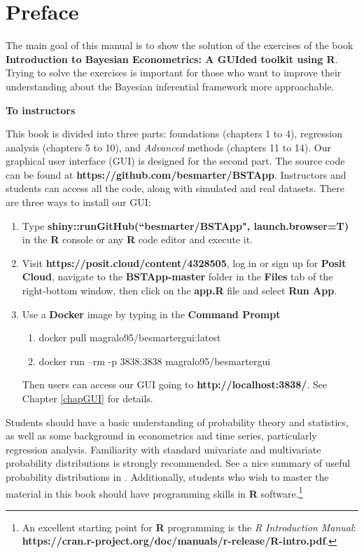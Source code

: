\chapter*{Preface}
The main goal of this manual is to show the solution of the exercises of the book \textbf{Introduction to Bayesian Econometrics: A GUIded toolkit using R}. Trying to solve the exercises is important for those who want to improve their understanding about the Bayesian inferential framework more approachable.

\textbf{To instructors}

This book is divided into three parts: foundations (chapters 1 to 4), regression analysis (chapters 5 to 10), and \textit{Advanced} methods (chapters 11 to 14). Our graphical user interface (GUI) is designed for the second part. The source code can be found at \textbf{https://github.com/besmarter/BSTApp}. Instructors and students can access all the code, along with simulated and real datasets. There are three ways to install our GUI:

\begin{enumerate}
	\item Type \textbf{shiny::runGitHub(``besmarter/BSTApp", launch.browser=T)} in the \textbf{R} console or any \textbf{R} code editor and execute it.
	\item Visit \textbf{https://posit.cloud/content/4328505}, log in or sign up for \textbf{Posit Cloud}, navigate to the \textbf{BSTApp-master} folder in the \textbf{Files} tab of the right-bottom window, then click on the \textbf{app.R} file and select \textbf{Run App}.
	\item Use a \textbf{Docker} image by typing in the \textbf{Command Prompt}
	\begin{enumerate}
		\item docker pull magralo95/besmartergui:latest
		\item docker run --rm -p 3838:3838 magralo95/besmartergui
	\end{enumerate}
	Then users can access our GUI going to \textbf{http://localhost:3838/}. See Chapter \ref{chapGUI} for details.
\end{enumerate}

Students should have a basic understanding of probability theory and statistics, as well as some background in econometrics and time series, particularly regression analysis. Familiarity with standard univariate and multivariate probability distributions is strongly recommended. See a nice summary of useful probability distributions in \cite[p.~182-191]{greenberg2012introduction}. Additionally, students who wish to master the material in this book should have programming skills in \textbf{R} software.\footnote{An excellent starting point for \textbf{R} programming is the \textit{R Introduction Manual}: \textbf{https://cran.r-project.org/doc/manuals/r-release/R-intro.pdf}.}


